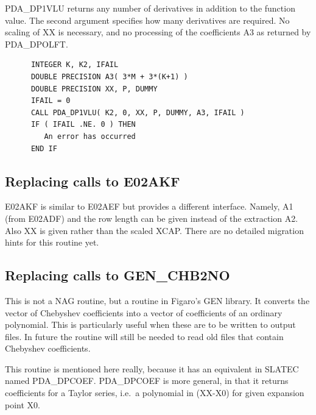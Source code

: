 \documentclass[11pt,twoside]{article}
\newcommand{\htmlref}[2]{#1}
\newcommand{\xref}[3]{#1}
\newcommand{\xlabel}[1]{}
\begin{document}
   PDA\_DP1VLU returns any number of derivatives in addition to the function
   value. The second argument specifies how many derivatives are
   required. No scaling of XX is necessary, and no processing of the
   coefficients A3 as returned by
\htmlref{PDA\_DPOLFT.}{PDA\_DPOLFT}

\begin{verbatim}
      INTEGER K, K2, IFAIL
      DOUBLE PRECISION A3( 3*M + 3*(K+1) )
      DOUBLE PRECISION XX, P, DUMMY
      IFAIL = 0
      CALL PDA_DP1VLU( K2, 0, XX, P, DUMMY, A3, IFAIL )
      IF ( IFAIL .NE. 0 ) THEN
         An error has occurred
      END IF
\end{verbatim}


\subsection{\xlabel{replacing_calls_to_e02akf}Replacing calls to E02AKF}

   E02AKF is similar to
\htmlref{E02AEF}{m_e02aef}
   but provides a different interface.
   Namely, A1 (from
\htmlref{E02ADF)}{m_e02adf}
   and the row length can be given instead of the extraction
   A2. Also XX is given rather than the scaled XCAP. There are no
   detailed migration hints for this routine yet.


\subsection{\xlabel{replacing_calls_to_genchb2no}Replacing calls to GEN\_CHB2NO}

   This is not a NAG routine, but a routine in
\xref{Figaro's}{sun86}{}
   GEN library. It converts the vector of Chebyshev coefficients into a
   vector of coefficients of an ordinary polynomial. This is
   particularly useful when these are to be written to output files. In
   future the routine will still be needed to read old files that
   contain Chebyshev coefficients.

   This routine is mentioned here really, because it has an equivalent
   in SLATEC named PDA\_\-DPCOEF.
\htmlref{PDA\_DPCOEF}{PDA\_DPCOEF}
   is more general, in that it returns
   coefficients for a Taylor series, i.e.\ a polynomial in (XX-X0) for
   given expansion point X0.
\end{document}
